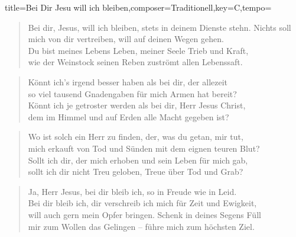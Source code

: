 \documentclass{leadsheet-modern}
\begin{document}
\begin{song}{title={Bei Dir Jesu will ich bleiben},composer={Traditionell},key={C},tempo={}}

\begin{schedule}
\end{schedule}
\begin{verse}
Bei dir, Jesus, will ich bleiben, stets in deinem Dienste stehn.
Nichts soll mich von dir vertreiben, will auf deinen Wegen gehen. \\
Du bist meines Lebens Leben, meiner Seele Trieb und Kraft, \\
wie der Weinstock seinen Reben zuströmt allen Lebenssaft.
\end{verse}
\begin{verse}
Könnt ich's irgend besser haben als bei dir, der allezeit \\
so viel tausend Gnadengaben für mich Armen hat bereit? \\
Könnt ich je getroster werden als bei dir, Herr Jesus Christ, \\
dem im Himmel und auf Erden alle Macht gegeben ist?
\end{verse}
\begin{verse}
Wo ist solch ein Herr zu finden, der, was du getan, mir tut, \\
mich erkauft von Tod und Sünden mit dem eignen teuren Blut? \\
Sollt ich dir, der mich erhoben und sein Leben für mich gab, \\
sollt ich dir nicht Treu geloben, Treue über Tod und Grab?
\end{verse}
\begin{verse}
Ja, Herr Jesus, bei dir bleib ich, so in Freude wie in Leid. \\
Bei dir bleib ich, dir verschreib ich mich für Zeit und Ewigkeit, \\
will auch gern mein Opfer bringen. Schenk in deines Segens Füll \\
mir zum Wollen das Gelingen -- führe mich zum höchsten Ziel. 
\end{verse}

\end{song}
\end{document}
